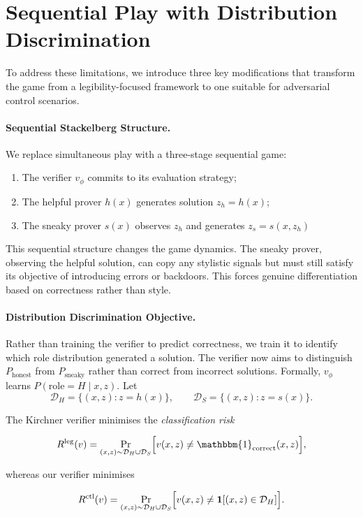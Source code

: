 \section{Sequential Play with Distribution Discrimination}

To address these limitations, we introduce three key modifications that transform the game from a legibility-focused framework to one suitable for adversarial control scenarios.

\paragraph{Sequential Stackelberg Structure.} We replace simultaneous play with a three-stage sequential game:
\begin{enumerate}
    \item The verifier $v_\phi$ commits to its evaluation strategy;
    \item The helpful prover $h(x)$ generates solution $z_h = h(x)$;
    \item The sneaky prover $s(x)$ observes $z_h$ and generates $z_s = s(x, z_h)$
\end{enumerate}

This sequential structure changes the game dynamics. The sneaky prover, observing the helpful solution, can copy any stylistic signals but must still satisfy its objective of introducing errors or backdoors. This forces genuine differentiation based on correctness rather than style.

\paragraph{Distribution Discrimination Objective.} Rather than training the verifier to predict correctness, we train it to identify which role distribution generated a solution. The verifier now aims to distinguish $P_{\text{honest}}$ from $P_{\text{sneaky}}$ rather than correct from incorrect solutions. Formally, $v_\phi$ learns $P(\text{role}=H\mid x,z)$. Let
\[
\mathcal D_H=\bigl\{(x,z):z=h(x)\bigr\},\qquad
\mathcal D_S=\bigl\{(x,z):z=s(x)\bigr\}.
\]

The Kirchner verifier minimises the \textit{classification risk}

\[
R^\text{leg}(v)=\Pr_{(x,z)\sim\mathcal D_H\cup\mathcal D_S}
               \Bigl[v(x,z)\neq \mathbbm{1}_{\text{correct}}(x,z)\Bigr],
\]

whereas our verifier minimises

\[
R^\text{ctl}(v)=\Pr_{(x,z)\sim\mathcal D_H\cup\mathcal D_S}
                \Bigl[v(x,z)\neq\mathbf 1[(x,z)\in\mathcal D_H]\Bigr].
\]

